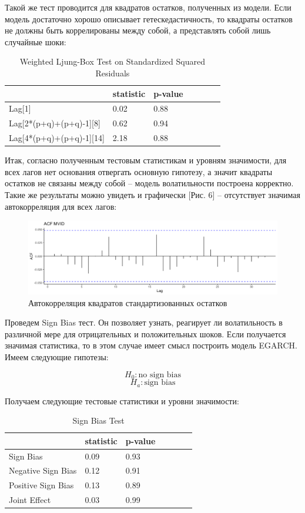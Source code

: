 \documentclass[a4paper,12pt,twoside]{article}
\begin{document}
Такой же тест проводится для квадратов остатков, полученных из модели.
Если модель достаточно хорошо описывает гетескедастичность, то квадраты остатков не должны быть коррелированы между собой, а представлять собой лишь случайные шоки:

\begin{table}[!h]
\centering
\begin{tabular}{lllllll}
  \hline
          &  statistic  &  p-value  \\
  \hline
  Lag[1]  & 0.02 & 0.88 \\
  Lag[2*(p+q)+(p+q)-1][8]  & 0.62 &  0.94 \\
  Lag[4*(p+q)+(p+q)-1][14]  & 2.18 &  0.88 \\
  \hline
\end{tabular}
\caption{Weighted Ljung-Box Test on Standardized Squared Residuals}
\end{table}

Итак, согласно полученным тестовым статистикам и уровням значимости, для всех лагов нет основания отвергать основную гипотезу, а значит квадраты остатков не связаны между собой – модель волатильности построена корректно. Такие же результаты можно увидеть и графически [Рис. 6] – отсутствует значимая автокорреляция для всех лагов:

\begin{figure}[!h]
    \includegraphics[scale = 0.45]{mvideo_6.png}
    \caption{Автокорреляция квадратов стандартизованных остатков}
    \label{fig:mvideo_06}
\end{figure}

Проведем Sign Bias тест.
Он позволяет узнать, реагирует ли волатильность в различной мере для отрицательных и положительных шоков.  Если получается значимая статистика, то в этом случае имеет смысл построить модель EGARCH. Имеем следующие гипотезы:

$$
H_0: \text{no sign bias}
$$
$$
H_a: \text{sign bias}
$$

Получаем следующие тестовые статистики и уровни значимости:

\begin{table}[!h]
\centering
\begin{tabular}{lllllll}
  \hline
          &  statistic  &  p-value  \\
  \hline
  Sign Bias   & 0.09 & 0.93 \\
  Negative Sign Bias  & 0.12 &  0.91 \\
  Positive Sign Bias  & 0.13 &  0.89 \\
  Joint Effect   & 0.03 &  0.99 \\
  \hline
\end{tabular}
\caption{Sign Bias Test}
\end{table}
\end{document}
